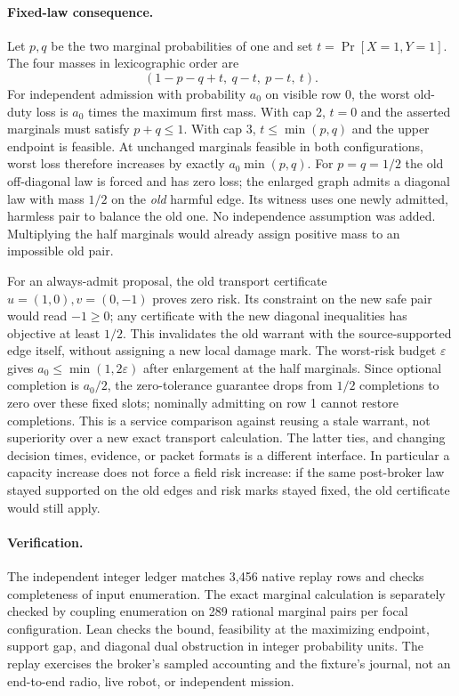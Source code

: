 \documentclass{article}
\begin{document}
\paragraph{Fixed-law consequence.}
Let $p,q$ be the two marginal probabilities of one and set
$t=\Pr[X=1,Y=1]$. The four masses in lexicographic order are
\[
 (1-p-q+t,\ q-t,\ p-t,\ t).
\]
For independent admission with probability $a_0$ on visible row 0,
the worst old-duty loss is $a_0$ times the maximum first mass. With cap 2,
$t=0$ and the asserted marginals must satisfy $p+q\le1$.
With cap 3, $t\le\min(p,q)$ and the upper endpoint is feasible.
At unchanged marginals feasible in both configurations, worst loss
therefore increases by exactly $a_0\min(p,q)$. For $p=q=1/2$ the old
off-diagonal law is forced and has zero loss; the enlarged graph admits
a diagonal law with mass $1/2$ on the \emph{old} harmful edge. Its
witness uses one newly admitted, harmless pair to balance the old one.
No independence assumption was added. Multiplying the half marginals
would already assign positive mass to an impossible old pair.

For an always-admit proposal, the old transport certificate
$u=(1,0),v=(0,-1)$ proves zero risk. Its constraint on the new safe pair
would read $-1\ge0$; any certificate with the new diagonal inequalities
has objective at least $1/2$. This invalidates the old warrant with the
source-supported edge itself, without assigning a new local damage mark.
The worst-risk budget $\varepsilon$ gives $a_0\le\min(1,2\varepsilon)$
after enlargement at the half marginals. Since optional completion is
$a_0/2$, the zero-tolerance guarantee drops from $1/2$ completions to zero
over these fixed slots; nominally admitting on row 1 cannot restore
completions. This is a service comparison against reusing a stale warrant,
not superiority over a new exact transport calculation. The latter ties,
and changing decision times, evidence, or packet formats is a different
interface. In particular a capacity increase does not force a field
risk increase: if the same post-broker law stayed supported on the old
edges and risk marks stayed fixed, the old certificate would still apply.

\paragraph{Verification.} The independent integer ledger matches 3,456
native replay rows and checks completeness of input enumeration.
The exact marginal calculation is separately checked by coupling
enumeration on 289 rational marginal pairs per focal configuration.
Lean checks the bound, feasibility at the maximizing endpoint, support
gap, and diagonal dual obstruction in integer probability units.
The replay exercises the broker's sampled accounting and the fixture's
journal, not an end-to-end radio, live robot, or independent mission.
\end{document}
